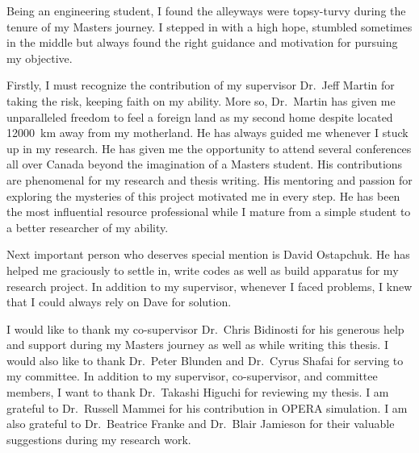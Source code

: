\newpage
\tableofcontents
{}
\listoffigures
\listoftables

\begin{acknowledgments}
\vspace{2em}

Being an engineering student, I found the alleyways were topsy-turvy during the tenure of my Masters journey. I stepped in with a high hope, stumbled sometimes in the middle but always found the right guidance and motivation for pursuing my objective. 

Firstly, I must recognize the contribution of my supervisor Dr.~Jeff Martin for taking the risk, keeping faith on my ability. More so, Dr.~Martin has given me unparalleled freedom to feel a foreign land as my second home despite located 12000~km away from my motherland. He has always guided me whenever I stuck up in my research. He has given me the opportunity to attend several conferences all over Canada beyond the imagination of a Masters student. His contributions are phenomenal for my research and thesis writing. His mentoring and passion for exploring the mysteries of this project motivated me in every step. He has been the most influential resource professional while I mature from a simple student to a better researcher of my ability.  




Next important person who deserves special mention is David Ostapchuk.  He has helped me graciously to settle in, write codes as well as build apparatus for my research project. In addition to my supervisor, whenever I faced problems, I knew that I could always rely on Dave for solution.

I would like to thank my co-supervisor Dr.~Chris Bidinosti for his generous help and support during my Masters journey as well as while writing this thesis. I would also like to thank Dr.~Peter Blunden and Dr.~Cyrus Shafai for serving to my committee. In addition to my supervisor, co-supervisor, and committee members, I want to thank Dr.~Takashi Higuchi for reviewing my thesis. I am grateful to Dr.~Russell Mammei for his contribution in OPERA simulation. I am also grateful to Dr.~Beatrice Franke and Dr.~Blair Jamieson for their valuable suggestions during my research work. 



\end{acknowledgments}
